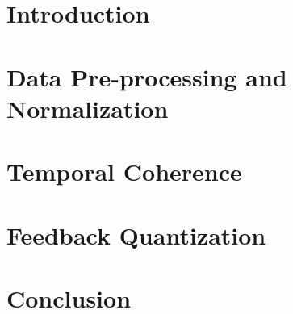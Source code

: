 \documentclass[12pt]{report}
\title{}
\author{
	\authorName\\
	\authorDepartment\\
	\authorAddress \\ %
	\authorEmail \\
}
\date{\today}
\begin{document}
	


\newpage
\tableofcontents

\newpage

\chapter{Introduction}


\chapter{Data Pre-processing and Normalization}
\label{chap:sph_norm}


\chapter{Temporal Coherence}
\label{chap:markovnet}


\chapter{Feedback Quantization}
\label{chap:csinet_quant}


\chapter{Conclusion}


\newpage
\small


\end{document}
